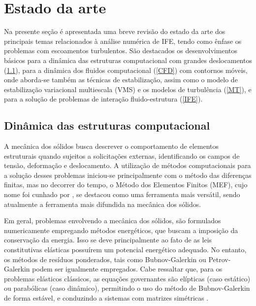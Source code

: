 \section{Estado da arte}

Na presente seção é apresentada uma breve revisão do estado da arte dos principais temas relacionados à análise numérica de IFE, tendo como ênfase os problemas com escoamentos turbulentos. São destacados os desenvolvimentos básicos para a dinâmica das estruturas computacional com grandes deslocamentos (\ref{CSD}), para a dinâmica dos fluidos computacional (\ref{CFD}) com contornos móveis, onde aborda-se também as técnicas de estabilização, assim como o modelo de estabilização variacional multiescala (VMS) e os modelos de turbulência (\ref{MT}), e para a solução de problemas de interação fluido-estrutura (\ref{IFE}).

\subsection{Dinâmica das estruturas computacional} \label{CSD}

A mecânica dos sólidos busca descrever o comportamento de elementos estruturais quando sujeitos a solicitações externas, identificando os campos de tensão, deformação e deslocamento. A utilização de métodos computacionais para a solução desses problemas iniciou-se principalmente com o método das diferenças finitas, mas no decorrer do tempo, o Método dos Elementos Finitos (MEF), cujo nome foi cunhado por , se destacou como uma ferramenta mais versátil, sendo atualmente a ferramenta mais difundida na mecânica dos sólidos.

Em geral, problemas envolvendo a mecânica dos sólidos, são formulados numericamente empregando métodos energéticos, que buscam a imposição da conservação da energia. Isso se deve principalmente ao fato de as leis constitutivas elásticas possuírem um potencial energético adequado. No entanto, os métodos de resíduos ponderados, tais como Bubnov-Galerkin ou Petrov-Galerkin podem ser igualmente empregados. Cabe ressaltar que, para os problemas elásticos clássicos, as equações governantes são elípticas (caso estático) ou parabólicas (caso dinâmico), permitindo o uso do método de Bubnov-Galerkin de forma estável, e conduzindo a sistemas com matrizes simétricas \cite{de2012nonlinear}.

